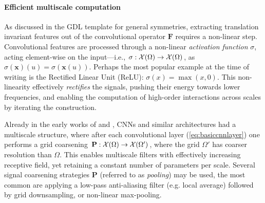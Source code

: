 \paragraph{Efficient multiscale computation} 
As discussed in the GDL template for general symmetries, extracting translation invariant features out of the convolutional operator $\mathbf{F}$ requires a non-linear step. %
Convolutional features are processed through a non-linear %
\emph{activation function} $\sigma$, acting element-wise on the input---i.e., $\sigma: {\mathcal{X}}(\Omega) \to {\mathcal{X}}(\Omega)$, as $\sigma(\mathbf{x})(u) = \sigma(\mathbf{x}(u))$. Perhaps the most popular example at the time of writing is the Rectified Linear Unit (ReLU): $\sigma(x) = \max(x, 0)$. %
This non-linearity effectively \emph{rectifies} the signals, pushing their energy towards lower frequencies, and enabling the computation of high-order interactions across scales by iterating the construction.

Already in the early works of \cite{fukushima1982neocognitron} and \cite{lecun1998gradient}, CNNs and similar architectures 
had a multiscale structure, where after each convolutional layer (\ref{eq:basiccnnlayer}) one performs a grid coarsening 
$\mathbf{P} : {\mathcal{X}}(\Omega) \to {\mathcal{X}}(\Omega')$, where the grid $\Omega'$ has coarser resolution than $\Omega$. 
This enables 
multiscale filters with effectively increasing receptive field, yet retaining a constant number of parameters per scale. 
%
Several signal coarsening %
strategies $\mathbf{P}$ (referred to as \emph{pooling}) may be used, the most common are %
applying a low-pass anti-aliasing filter (e.g. local average) followed by grid downsampling, or non-linear max-pooling. 
%
%

